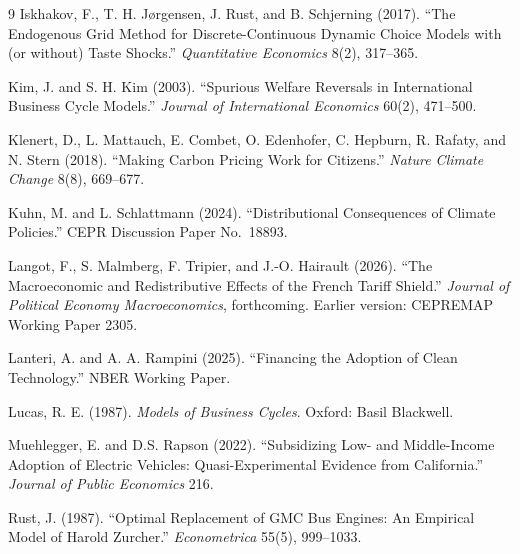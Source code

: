 \begin{thebibliography}{9}
Iskhakov, F., T. H. J{\o}rgensen, J. Rust, and B. Schjerning (2017).
``The Endogenous Grid Method for Discrete-Continuous Dynamic Choice Models with
(or without) Taste Shocks.'' \emph{Quantitative Economics} 8(2), 317--365.

Kim, J. and S. H. Kim (2003).
``Spurious Welfare Reversals in International Business Cycle Models.''
\emph{Journal of International Economics} 60(2), 471--500.

Klenert, D., L. Mattauch, E. Combet, O. Edenhofer, C. Hepburn, R. Rafaty, and N. Stern (2018).
``Making Carbon Pricing Work for Citizens.'' \emph{Nature Climate Change} 8(8), 669--677.

Kuhn, M. and L. Schlattmann (2024).
``Distributional Consequences of Climate Policies.'' CEPR Discussion Paper No.\ 18893.

Langot, F., S. Malmberg, F. Tripier, and J.-O. Hairault (2026).
``The Macroeconomic and Redistributive Effects of the French Tariff Shield.''
\emph{Journal of Political Economy Macroeconomics}, forthcoming.
Earlier version: CEPREMAP Working Paper 2305.

Lanteri, A. and A. A. Rampini (2025).
``Financing the Adoption of Clean Technology.'' NBER Working Paper.

Lucas, R. E. (1987).
\emph{Models of Business Cycles}. Oxford: Basil Blackwell.

Muehlegger, E. and D.S. Rapson (2022).
``Subsidizing Low- and Middle-Income Adoption of Electric Vehicles: Quasi-Experimental Evidence from California.''
\emph{Journal of Public Economics} 216.

Rust, J. (1987).
``Optimal Replacement of GMC Bus Engines: An Empirical Model of Harold Zurcher.''
\emph{Econometrica} 55(5), 999--1033.

\end{thebibliography}
